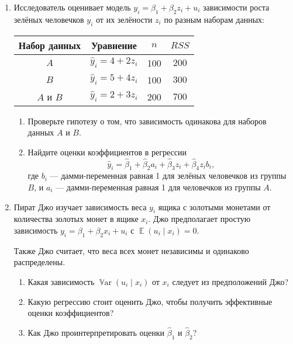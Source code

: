 \documentclass[12pt]{article}
\DeclareMathOperator{\E}{\mathbb{E}}
\DeclareMathOperator{\Var}{\mathbb{V}ar}
\begin{document}
\newpage
\begin{enumerate}
    \item Исследователь оценивает модель $y_i = \beta_1 + \beta_2 z_i + u_i$ зависимости 
    роста зелёных человечков $y_i$ от их зелёности $z_i$ по разным наборам данных:

    \begin{tabular}{cccc}
        \toprule 
        Набор данных & Уравнение & $n$ & $RSS$ \\
        \midrule
        $A$ & $\hat y_i = 4 + 2 z_i$ & 100 & $200$ \\
        $B$ & $\hat y_i = 5 + 4 z_i$ & 100 & $300$ \\
        $A$ и $B$ & $\hat y_i = 2 + 3 z_i$ & 200 & $700$ \\
        \bottomrule
    \end{tabular}

    \begin{enumerate}
        \item Проверьте гипотезу о том, что зависимость одинакова для наборов данных $A$ и $B$.
        
        \item Найдите оценки коэффициентов в регрессии 
        \[
        \hat y_i = \hat\beta_1 + \hat\beta_2 a_i + \hat\beta_3 z_i + \hat\beta_4 z_i b_i,
        \]
        где $b_i$ — дамми-переменная равная 1 для зелёных человечков из группы $B$,
        и $a_i$ — дамми-переменная равная 1 для человечков из группы $A$.
        
    \end{enumerate}

    \item Пират Джо изучает зависимость веса $y_i$ ящика с золотыми монетами от количества золотых монет в ящике $x_i$. 
    Джо предполагает простую зависимость $y_i = \beta_1 + \beta_2 x_i + u_i$ с $\E(u_i \mid x_i) = 0$.

    Также Джо считает, что веса всех монет независимы и одинаково распределены. 
    \begin{enumerate}
        \item Какая зависимость $\Var(u_i \mid x_i)$ от $x_i$ следует из предположений Джо?
        \item Какую регрессию стоит оценить Джо, чтобы получить эффективные оценки коэффициентов?
        \item Как Джо проинтерпретировать оценки $\hat\beta_1$ и $\hat\beta_2$?
    \end{enumerate}
    

\end{enumerate}
\end{document}
